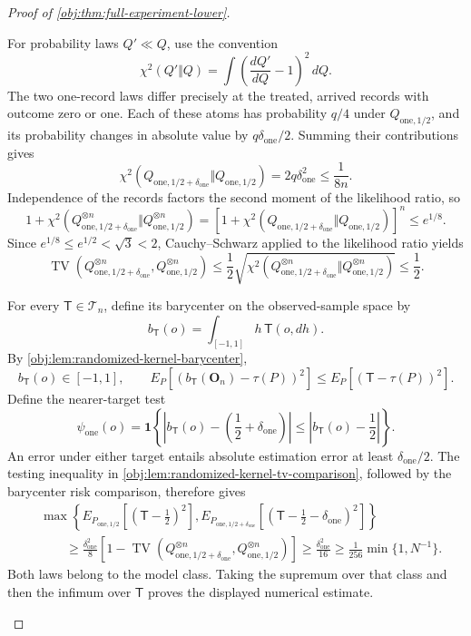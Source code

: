 \begin{proof}[Proof of \cref{obj:thm:full-experiment-lower}]
\begin{enumerate}
For probability laws \(Q'\ll Q\), use the convention
\[
\chi^2(Q'\Vert Q)
=\int\left(\frac{dQ'}{dQ}-1\right)^2\,dQ.
\]
The two one-record laws differ precisely at the treated, arrived records with
outcome zero or one. Each of these atoms has probability \(q/4\) under
\(Q_{\mathrm{one},1/2}\), and its probability changes in absolute value by
\(q\delta_{\mathrm{one}}/2\). Summing their contributions gives
\[
\chi^2\!\left(
Q_{\mathrm{one},1/2+\delta_{\mathrm{one}}}
\Vert Q_{\mathrm{one},1/2}\right)
=2q\delta_{\mathrm{one}}^2
\le\frac{1}{8n}.
\]
Independence of the records factors the second moment of the likelihood ratio,
so
\[
1+\chi^2\!\left(
Q_{\mathrm{one},1/2+\delta_{\mathrm{one}}}^{\otimes n}
\Vert Q_{\mathrm{one},1/2}^{\otimes n}\right)
=
\left[
1+\chi^2\!\left(
Q_{\mathrm{one},1/2+\delta_{\mathrm{one}}}
\Vert Q_{\mathrm{one},1/2}\right)
\right]^n
\le e^{1/8}.
\]
Since \(e^{1/8}\le e^{1/2}<\sqrt3<2\), Cauchy--Schwarz applied to the
likelihood ratio yields
\[
\operatorname{TV}\!\left(
Q_{\mathrm{one},1/2+\delta_{\mathrm{one}}}^{\otimes n},
Q_{\mathrm{one},1/2}^{\otimes n}\right)
\le
\frac12\sqrt{
\chi^2\!\left(
Q_{\mathrm{one},1/2+\delta_{\mathrm{one}}}^{\otimes n}
\Vert Q_{\mathrm{one},1/2}^{\otimes n}\right)}
\le\frac12.
\]

For every \(\mathsf T\in\mathcal T_n\), define its barycenter on the
observed-sample space by
\[
b_{\mathsf T}(o)=\int_{[-1,1]}h\,\mathsf T(o,dh).
\]
By \cref{obj:lem:randomized-kernel-barycenter},
\[
b_{\mathsf T}(o)\in[-1,1],
\qquad
E_P[(b_{\mathsf T}(\mathbf O_n)-\tau(P))^2]
\le E_P[(\mathsf T-\tau(P))^2].
\]
Define the nearer-target test
\[
\psi_{\mathrm{one}}(o)
=
\mathbf1\left\{
\left|b_{\mathsf T}(o)-\left(\frac12+\delta_{\mathrm{one}}\right)\right|
\le
\left|b_{\mathsf T}(o)-\frac12\right|
\right\}.
\]
An error under either target entails absolute estimation error at least
\(\delta_{\mathrm{one}}/2\). The testing inequality in
\cref{obj:lem:randomized-kernel-tv-comparison}, followed by the barycenter
risk comparison, therefore gives
\[
\begin{aligned}
&\max\left\{
E_{P_{\mathrm{one},1/2}}\!\left[(\mathsf T-\tfrac12)^2\right],
E_{P_{\mathrm{one},1/2+\delta_{\mathrm{one}}}}\!
\left[(\mathsf T-\tfrac12-\delta_{\mathrm{one}})^2\right]
\right\}\\
&\qquad\ge
\frac{\delta_{\mathrm{one}}^2}{8}
\left[
1-\operatorname{TV}\!\left(
Q_{\mathrm{one},1/2+\delta_{\mathrm{one}}}^{\otimes n},
Q_{\mathrm{one},1/2}^{\otimes n}\right)
\right]
\ge\frac{\delta_{\mathrm{one}}^2}{16}
\ge\frac1{256}\min\{1,N^{-1}\}.
\end{aligned}
\]
Both laws belong to the model class. Taking the supremum over that class and
then the infimum over \(\mathsf T\) proves the displayed numerical estimate.


\end{enumerate}
\end{proof}
